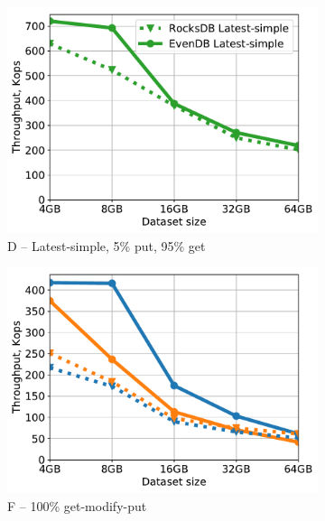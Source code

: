 \begin{figure}[tb]
\begin{subfigure}{0.33\linewidth}
\includegraphics[width=\textwidth]{figs/Workload_D_line.pdf}
\caption{D -- Latest-simple, 5\% put, 95\% get}
\label{fig:throughput:d}
\end{subfigure}
\begin{subfigure}{0.33\linewidth}
\includegraphics[width=\textwidth]{figs/Workload_F_line.pdf}
\caption{F -- 100\% get-modify-put}
\label{fig:throughput:f}
\end{subfigure}
\hspace{70pt}
\begin{subfigure}{0.33\linewidth}

\end{subfigure}
\end{figure}
